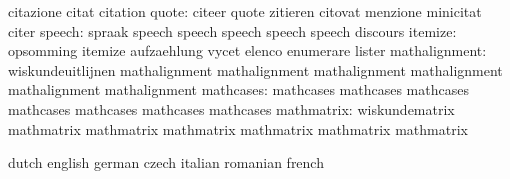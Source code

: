                            citazione                 citat
                           citation
                    quote: citeer                    quote
                           zitieren                  citovat
                           menzione                  minicitat
                           citer
                   speech: spraak                    speech
                           speech                    speech
                           speech                    speech
                           discours
                  itemize: opsomming                 itemize
                           aufzaehlung               vycet
                           elenco                    enumerare
                           lister
            mathalignment: wiskundeuitlijnen         mathalignment
                           mathalignment             mathalignment
                           mathalignment             mathalignment
                           mathalignment
                mathcases: mathcases                 mathcases
                           mathcases                 mathcases
                           mathcases                 mathcases
                           mathcases
               mathmatrix: wiskundematrix            mathmatrix
                           mathmatrix                mathmatrix
                           mathmatrix                mathmatrix
                           mathmatrix

\stopvariables




\startconstants            dutch                     english
                           german                    czech
                           italian                   romanian
                           french

